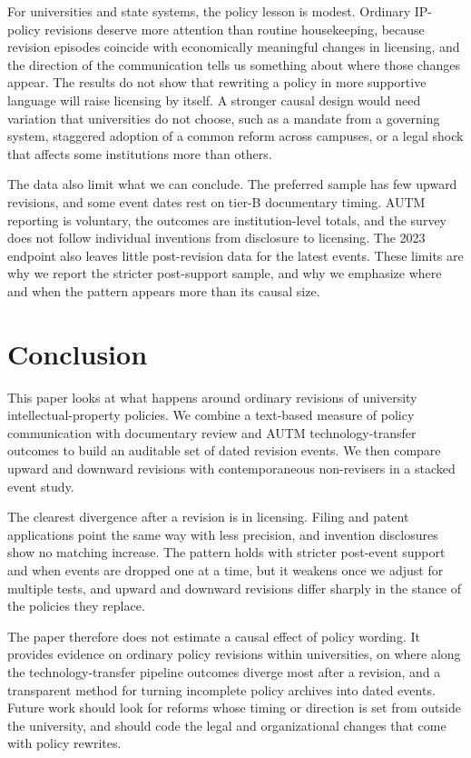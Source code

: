 For universities and state systems, the policy lesson is modest. Ordinary IP-policy revisions deserve more attention than routine housekeeping, because revision episodes coincide with economically meaningful changes in licensing, and the direction of the communication tells us something about where those changes appear. The results do not show that rewriting a policy in more supportive language will raise licensing by itself. A stronger causal design would need variation that universities do not choose, such as a mandate from a governing system, staggered adoption of a common reform across campuses, or a legal shock that affects some institutions more than others.

The data also limit what we can conclude. The preferred sample has few upward revisions, and some event dates rest on tier-B documentary timing. AUTM reporting is voluntary, the outcomes are institution-level totals, and the survey does not follow individual inventions from disclosure to licensing. The 2023 endpoint also leaves little post-revision data for the latest events. These limits are why we report the stricter post-support sample, and why we emphasize where and when the pattern appears more than its causal size.

\section{Conclusion}\label{sec:conclusion}

This paper looks at what happens around ordinary revisions of university intellectual-property policies. We combine a text-based measure of policy communication with documentary review and AUTM technology-transfer outcomes to build an auditable set of dated revision events. We then compare upward and downward revisions with contemporaneous non-revisers in a stacked event study.

The clearest divergence after a revision is in licensing. Filing and patent applications point the same way with less precision, and invention disclosures show no matching increase. The pattern holds with stricter post-event support and when events are dropped one at a time, but it weakens once we adjust for multiple tests, and upward and downward revisions differ sharply in the stance of the policies they replace.

The paper therefore does not estimate a causal effect of policy wording. It provides evidence on ordinary policy revisions within universities, on where along the technology-transfer pipeline outcomes diverge most after a revision, and a transparent method for turning incomplete policy archives into dated events. Future work should look for reforms whose timing or direction is set from outside the university, and should code the legal and organizational changes that come with policy rewrites.

